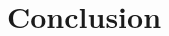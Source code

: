 \documentclass[conference]{IEEEtran}
\begin{document}
\section{Conclusion}



%

\begin{spacing}{0.81}


\end{spacing}
\end{document}
